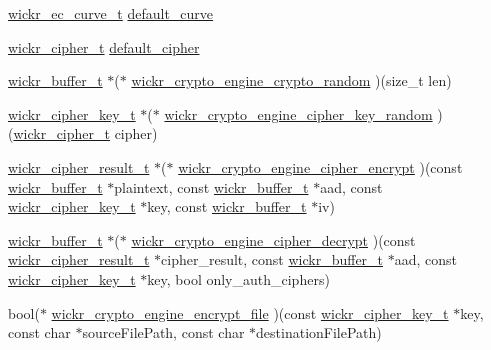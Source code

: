 \begin{DoxyCompactItemize}
\item 
\mbox{\hyperlink{structwickr__ec__curve}{wickr\+\_\+ec\+\_\+curve\+\_\+t}} \mbox{\hyperlink{structwickr__crypto__engine_a2145e35235dc5c5c944f33ea3d2963bd}{default\+\_\+curve}}
\item 
\mbox{\hyperlink{structwickr__cipher}{wickr\+\_\+cipher\+\_\+t}} \mbox{\hyperlink{structwickr__crypto__engine_a307f7d46b55b1e0a93ce9d9489ba8fc5}{default\+\_\+cipher}}
\item 
\mbox{\hyperlink{structwickr__buffer}{wickr\+\_\+buffer\+\_\+t}} $\ast$($\ast$ \mbox{\hyperlink{group__wickr__crypto__engine_gae12855853c05caa473e748a62611d307}{wickr\+\_\+crypto\+\_\+engine\+\_\+crypto\+\_\+random}} )(size\+\_\+t len)
\item 
\mbox{\hyperlink{structwickr__cipher__key}{wickr\+\_\+cipher\+\_\+key\+\_\+t}} $\ast$($\ast$ \mbox{\hyperlink{group__wickr__crypto__engine_gabc120effc5248a491b18138f9b74b526}{wickr\+\_\+crypto\+\_\+engine\+\_\+cipher\+\_\+key\+\_\+random}} )(\mbox{\hyperlink{structwickr__cipher}{wickr\+\_\+cipher\+\_\+t}} cipher)
\item 
\mbox{\hyperlink{structwickr__cipher__result}{wickr\+\_\+cipher\+\_\+result\+\_\+t}} $\ast$($\ast$ \mbox{\hyperlink{group__wickr__crypto__engine_gaf7be0d0ca0d9e7a0c5c3b1ec0fd0918e}{wickr\+\_\+crypto\+\_\+engine\+\_\+cipher\+\_\+encrypt}} )(const \mbox{\hyperlink{structwickr__buffer}{wickr\+\_\+buffer\+\_\+t}} $\ast$plaintext, const \mbox{\hyperlink{structwickr__buffer}{wickr\+\_\+buffer\+\_\+t}} $\ast$aad, const \mbox{\hyperlink{structwickr__cipher__key}{wickr\+\_\+cipher\+\_\+key\+\_\+t}} $\ast$key, const \mbox{\hyperlink{structwickr__buffer}{wickr\+\_\+buffer\+\_\+t}} $\ast$iv)
\item 
\mbox{\hyperlink{structwickr__buffer}{wickr\+\_\+buffer\+\_\+t}} $\ast$($\ast$ \mbox{\hyperlink{group__wickr__crypto__engine_ga459ef821cc40edb5e3c9ce1d571ddc00}{wickr\+\_\+crypto\+\_\+engine\+\_\+cipher\+\_\+decrypt}} )(const \mbox{\hyperlink{structwickr__cipher__result}{wickr\+\_\+cipher\+\_\+result\+\_\+t}} $\ast$cipher\+\_\+result, const \mbox{\hyperlink{structwickr__buffer}{wickr\+\_\+buffer\+\_\+t}} $\ast$aad, const \mbox{\hyperlink{structwickr__cipher__key}{wickr\+\_\+cipher\+\_\+key\+\_\+t}} $\ast$key, bool only\+\_\+auth\+\_\+ciphers)
\item 
bool($\ast$ \mbox{\hyperlink{group__wickr__crypto__engine_gaa77b1bc373d92d9db9d801bcc4a4d29c}{wickr\+\_\+crypto\+\_\+engine\+\_\+encrypt\+\_\+file}} )(const \mbox{\hyperlink{structwickr__cipher__key}{wickr\+\_\+cipher\+\_\+key\+\_\+t}} $\ast$key, const char $\ast$source\+File\+Path, const char $\ast$destination\+File\+Path)

\end{DoxyCompactItemize}

